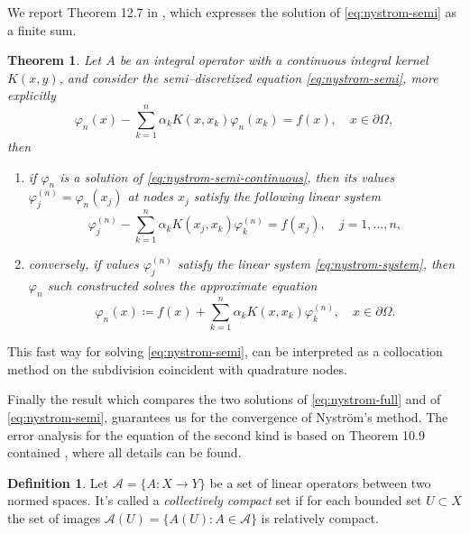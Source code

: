 \documentclass[10pt, a4paper, twoside, openright]{book}
\theoremstyle{definition}
\newtheorem{definition}[subsection]{Definition}
\theoremstyle{plain}
\newtheorem{theorem}[subsection]{Theorem}
\theoremstyle{plain}
\theoremstyle{plain}
\theoremstyle{plain}
\theoremstyle{plain}
\theoremstyle{plain}
\theoremstyle{plain}
\theoremstyle{plain}
\let\phi\varphi
\begin{document}
We report Theorem 12.7 in \cite{kress:book}, which expresses the solution of \eqref{eq:nystrom-semi} as a finite sum.
\begin{theorem}
 Let $A$ be an integral operator with a continuous integral kernel $K(x,y)$, 
 and consider the semi--discretized equation \eqref{eq:nystrom-semi}, more explicitly
 \begin{equation}
  \label{eq:nystrom-semi-continuous}
  \phi_n(x) -\sum_{k=1}^n\alpha_k K(x,x_k)\phi_n(x_k)=f(x), \quad x\in \partial \Omega,
 \end{equation}
 then
 \begin{enumerate}
  \item if $\phi_n$ is a solution of \eqref{eq:nystrom-semi-continuous}, then its values $\phi_j^{(n)} = \phi_n(x_j)$ 
  at nodes $x_j$ satisfy the following linear system
  \begin{equation}
    \label{eq:nystrom-system}
    \phi_j^{(n)} - \sum_{k=1}^n\alpha_k K(x_j,x_k)\phi_k^{(n)} = f(x_j),\quad j=1,...,n,
  \end{equation}
  \item conversely, if values $\phi_j^{(n)}$ satisfy the linear system \eqref{eq:nystrom-system}, then $\phi_n$ such constructed solves the approximate equation
  \begin{equation}
   \phi_n(x)\coloneqq f(x) + \sum_{k=1}^n\alpha_k K(x,x_k)\phi_k^{(n)}, \quad x\in \partial\Omega.
  \end{equation}
 \end{enumerate}
\end{theorem}
This fast way for solving \eqref{eq:nystrom-semi}, can be interpreted as a collocation method on the subdivision coincident with quadrature nodes.
\par
Finally the result which compares the two solutions of \eqref{eq:nystrom-full} and of 
\eqref{eq:nystrom-semi}, guarantees us for the convergence of Nystr\"om's method.
The error analysis for the equation of the second kind is based on Theorem 10.9 contained \cite{kress:book}, where all details can be found.
\begin{definition}
\label{def:collectively-compact}
 Let $\mathcal{A}=\{A:X\to Y\}$ be a set of linear operators between two normed spaces. It's called a \emph{collectively compact} set if for each bounded set $U\subset X$ the set of images $\mathcal{A}(U)=\{A(U):A\in\mathcal{A}\}$ is relatively compact.
\end{definition}
\end{document}
